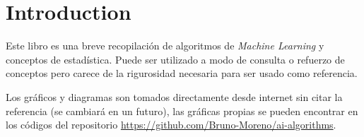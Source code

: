\chapter{Introduction}

Este libro es una breve recopilación de algoritmos de \textit{Machine Learning} y conceptos de estadística. Puede ser utilizado a modo de consulta o refuerzo de conceptos pero carece de la rigurosidad necesaria para ser usado como referencia. 

Los gráficos y diagramas son tomados directamente desde internet sin citar la referencia (se cambiará en un futuro), las gráficas propias se pueden encontrar en los códigos del repositorio \url{https://github.com/Bruno-Moreno/ai-algorithms}.